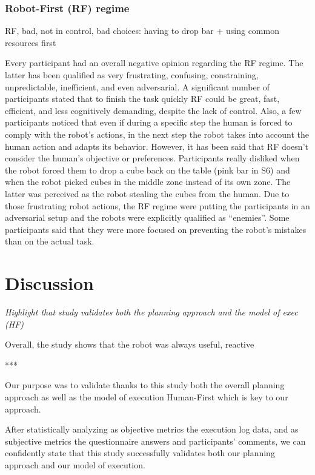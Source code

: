 \subsubsection{Robot-First (RF) regime}
RF, bad, not in control, bad choices: having to drop bar + using common resources first

Every participant had an overall negative opinion regarding the RF regime. The latter has been qualified as very frustrating, confusing, constraining, unpredictable, inefficient, and even adversarial. A significant number of participants stated that to finish the task quickly RF could be great, fast, efficient, and less cognitively demanding, despite the lack of control. Also, a few participants noticed that even if during a specific step the human is forced to comply with the robot's actions, in the next step the robot takes into account the human action and adapts its behavior. 
However, it has been said that RF doesn't consider the human's objective or preferences. Participants really disliked when the robot forced them to drop a cube back on the table (pink bar in S6) and when the robot picked cubes in the middle zone instead of its own zone. The latter was perceived as the robot stealing the cubes from the human.
Due to those frustrating robot actions, the RF regime were putting the participants in an adversarial setup and the robots were explicitly qualified as ``enemies''. Some participants said that they were more focused on preventing the robot's mistakes than on the actual task.


\section{Discussion}

\textit{Highlight that study validates both the planning approach and the model of exec (HF)}

Overall, the study shows that the robot was always useful, reactive

***

Our purpose was to validate thanks to this study both the overall planning approach as well as the model of execution Human-First which is key to our approach. 

After statistically analyzing as objective metrics the execution log data, and as subjective metrics the questionnaire answers and participants' comments, we can confidently state that this study successfully validates both our planning approach and our model of execution. 

